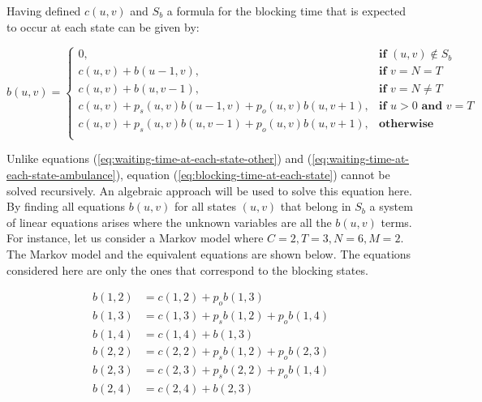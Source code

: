 Having defined \( c(u,v) \) and \(S_b\) a formula for the blocking time that is
expected to occur at each state can be given by:

\begin{equation}\label{eq:blocking-time-at-each-state}
    b(u,v) = 
    \begin{cases} 
        0, & \textbf{if } (u,v) \notin S_b \\
        c(u,v) + b(u - 1, v), & \textbf{if } v = N = T\\
        c(u,v) + b(u, v-1), & \textbf{if } v = N \neq T \\
        c(u,v) + p_s(u,v) b(u-1, v) + p_o(u,v) b(u, v+1), & \textbf{if } u > 0 \textbf{ and } v = T \\
        c(u,v) + p_s(u,v) b(u, v-1) + p_o(u,v) b(u, v+1), & \textbf{otherwise} \\
    \end{cases}
\end{equation}

Unlike equations (\ref{eq:waiting-time-at-each-state-other}) and 
(\ref{eq:waiting-time-at-each-state-ambulance}), equation 
(\ref{eq:blocking-time-at-each-state}) cannot be solved recursively. 
An algebraic approach will be used to solve this equation here. 
By finding all equations \(b(u,v)\) for all states \((u,v)\) that belong in \(S_b\) 
a system of linear equations arises where the unknown variables are all the \(b(u,v)\)
terms.
For instance, let us consider a Markov model where \(C=2, T=3, N=6, M=2\). 
The Markov model and the equivalent equations are shown below. 
The equations considered here are only the ones that correspond to the blocking 
states.

\begin{multicols*}{2}
    \scalebox{0.68}{}
    \columnbreak
    \vspace*{0cm} 
    \begin{align*}
        b(1,2) &= c(1,2) + p_o b(1,3) \\
        b(1,3) &= c(1,3) + p_s b(1,2) + p_o b(1,4) \\
        b(1,4) &= c(1,4) + b(1,3) \\
        b(2,2) &= c(2,2) + p_s b(1,2) + p_o b(2,3) \\
        b(2,3) &= c(2,3) + p_s b(2,2) + p_o b(1,4) \\
        b(2,4) &= c(2,4) + b(2,3)
    \end{align*}
\end{multicols*}


